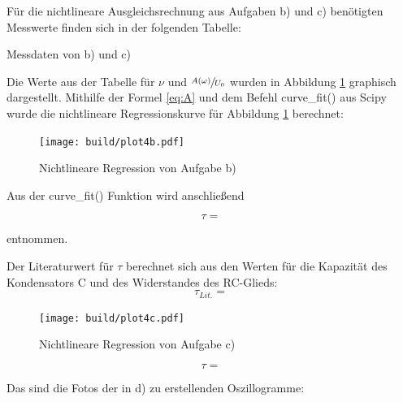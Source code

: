 
  Für die nichtlineare Ausgleichsrechnung aus Aufgaben b) und c) benötigten Messwerte finden sich in der folgenden Tabelle:

  \begin{table}[H]
        \centering
        \caption{Messdaten von b) und c)}
         
        \label{tab:data}
  \end{table}

  Die Werte aus der Tabelle für $\nu$ und $\sfrac{A(\omega)}{U_0}$ wurden in Abbildung \ref{fig:4b} graphisch
  dargestellt. Mithilfe der Formel \ref{eq:A} und dem Befehl curve\_fit() aus Scipy \cite{scipy} wurde 
  die nichtlineare Regressionskurve für Abbildung \ref{fig:4b} berechnet:

  \begin{figure}[H]
    \texttt{[image: build/plot4b.pdf]}
    \centering
    \caption{Nichtlineare Regression von Aufgabe b)}
    \label{fig:4b}
  \end{figure}

  Aus der curve\_fit() Funktion wird anschließend 

  \begin{equation}
  \tau = \text{}
  \end{equation}

  entnommen.
  
  Der Literaturwert für $\tau$ berechnet sich aus den Werten für die Kapazität des Kondensators C und 
  des Widerstandes des RC-Glieds:
  \begin{equation}
  \tau_{Lit.} = \text{}
  \end{equation}



  \begin{figure}[H]
    \texttt{[image: build/plot4c.pdf]}
    \centering
    \caption{Nichtlineare Regression von Aufgabe c)}
    \label{fig:4c}
  \end{figure}

  \begin{equation}
  \tau = \text{}
  \end{equation}

  \newpage
  Das sind die Fotos der in d) zu erstellenden Oszillogramme:

